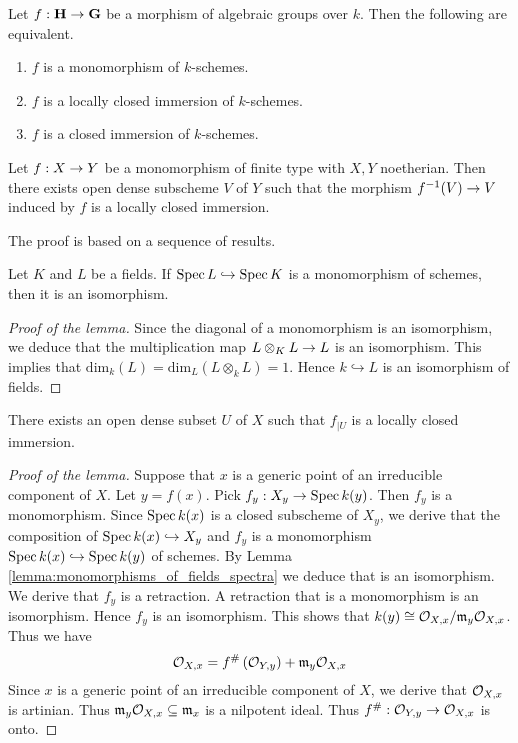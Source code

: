 \begin{theorem}\label{theorem:monomorphisms_of_algebraic_groups}
Let $f:\mathbf{H}\rightarrow \mathbf{G}$ be a morphism of algebraic groups over $k$. Then the following are equivalent.
\begin{enumerate}[label=\emph{\textbf{(\roman*)}}, leftmargin=3.0em]
\item $f$ is a monomorphism of $k$-schemes.
\item $f$ is a locally closed immersion of $k$-schemes.
\item $f$ is a closed immersion of $k$-schemes.
\end{enumerate}
\end{theorem}

\begin{theorem}\label{theorem:monomorphisms_of_algebraic_schemes}
Let $f:X\rightarrow Y$ be a monomorphism of finite type with $X,Y$ noetherian. Then there exists open dense subscheme $V$ of $Y$ such that the morphism $f^{-1}(V)\rightarrow V$ induced by $f$ is a locally closed immersion.
\end{theorem}
The proof is based on a sequence of results.

\begin{lemma}\label{lemma:monomorphisms_of_fields_spectra}
Let $K$ and $L$ be a fields. If $\mathrm{Spec}\, L\hookrightarrow \mathrm{Spec}\, K$ is a monomorphism of schemes, then it is an isomorphism. 
\end{lemma}
\begin{proof}[Proof of the lemma]
Since the diagonal of a monomorphism is an isomorphism, we deduce that the multiplication map $L\otimes_KL\rightarrow L$ is an isomorphism. This implies that $\mathrm{dim}_k(L) = \mathrm{dim}_L\left(L\otimes_kL\right) = 1$. Hence $k\hookrightarrow L$ is an isomorphism of fields.
\end{proof}

\begin{lemma}\label{lemma:local_embeddings}
There exists an open dense subset $U$ of $X$ such that $f_{\mid U}$ is a locally closed immersion.
\end{lemma}
\begin{proof}[Proof of the lemma]
Suppose that $x$ is a generic point of an irreducible component of $X$. Let $y = f(x)$. Pick $f_{y}:X_{y}\rightarrow \mathrm{Spec}\, k(y)$. Then $f_{y}$ is a monomorphism. Since $\mathrm{Spec}\, k(x)$ is a closed subscheme of $X_y$, we derive that the composition of $\mathrm{Spec}\, k(x)\hookrightarrow X_y$ and $f_y$ is a monomorphism $\mathrm{Spec}\, k(x)\hookrightarrow \mathrm{Spec}\, k(y)$ of schemes. By Lemma \ref{lemma:monomorphisms_of_fields_spectra} we deduce that is an isomorphism. We derive that $f_{y}$ is a retraction. A retraction that is a monomorphism is an isomorphism. Hence $f_y$ is an isomorphism. This shows that $k(y)\cong {\mathcal O}_{X,x}/\mathfrak{m}_y{\mathcal O}_{X,x}$. Thus we have
$${\mathcal O}_{X,x} = f^{\#}\left({\mathcal O}_{Y,y}\right)+\mathfrak{m}_{y}{\mathcal O}_{X,x}$$
Since $x$ is a generic point of an irreducible component of $X$, we derive that ${\mathcal O}_{X,x}$ is artinian. Thus $\mathfrak{m}_y{\mathcal O}_{X,x} \subseteq \mathfrak{m}_x$ is a nilpotent ideal. Thus $f^{\#}:{\mathcal O}_{Y,y}\rightarrow {\mathcal O}_{X,x}$ is onto.
\end{proof}

